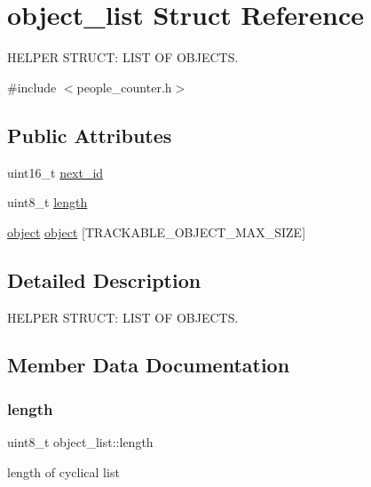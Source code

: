 \hypertarget{structobject__list}{}\section{object\+\_\+list Struct Reference}
\label{structobject__list}


H\+E\+L\+P\+ER S\+T\+R\+U\+CT\+: L\+I\+ST OF O\+B\+J\+E\+C\+TS.  




{\ttfamily \#include $<$people\+\_\+counter.\+h$>$}

\subsection*{Public Attributes}
\begin{DoxyCompactItemize}
\item 
uint16\+\_\+t \mbox{\hyperlink{structobject__list_a18c9ca5e7b3391aaeca34c1471311eb6}{next\+\_\+id}}
\item 
uint8\+\_\+t \mbox{\hyperlink{structobject__list_a6642be5c9bb86862e709f37f4b1172f1}{length}}
\item 
\mbox{\hyperlink{structobject}{object}} \mbox{\hyperlink{structobject__list_abcc549bdb02204da143d2efdd675861d}{object}} \mbox{[}T\+R\+A\+C\+K\+A\+B\+L\+E\+\_\+\+O\+B\+J\+E\+C\+T\+\_\+\+M\+A\+X\+\_\+\+S\+I\+ZE\mbox{]}
\end{DoxyCompactItemize}


\subsection{Detailed Description}
H\+E\+L\+P\+ER S\+T\+R\+U\+CT\+: L\+I\+ST OF O\+B\+J\+E\+C\+TS. 



\subsection{Member Data Documentation}
\mbox{\label{structobject__list_a6642be5c9bb86862e709f37f4b1172f1}} 
\subsubsection{\texorpdfstring{length}{length}}
{\footnotesize\ttfamily uint8\+\_\+t object\+\_\+list\+::length}

length of cyclical list \mbox{\label{structobject__list_a18c9ca5e7b3391aaeca34c1471311eb6}} 
